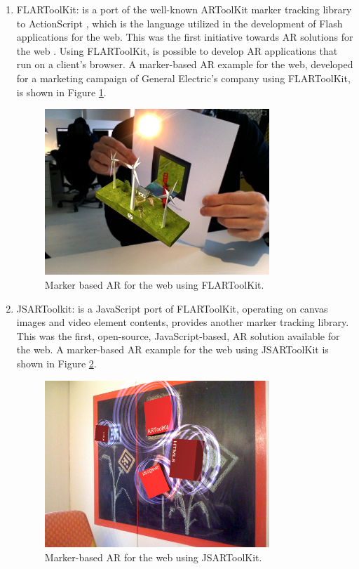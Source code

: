 \begin{enumerate}
    \item FLARToolKit: is a port of the well-known ARToolKit marker tracking library to ActionScript \cite{Flash2013}, which is the language utilized in the development of Flash applications for the web. This was the first initiative towards AR solutions for the web \cite{Pablo2013}. Using FLARToolKit, is possible to develop AR applications that run on a client's browser. A marker-based AR example for the web, developed for a marketing campaign of General Electric's company using FLARToolKit, is shown in Figure \ref{figure:flartoolkit}.

    \begin{figure}[!htb]
      \centering
      \includegraphics[width=240pt]{chapters/tracking_library_for_the_web/flartoolkit.png}
      \caption{Marker based AR for the web using FLARToolKit.}
      \label{figure:flartoolkit}
    \end{figure}

    \item JSARToolkit: is a JavaScript port of FLARToolKit, operating on canvas images and video element contents, provides another marker tracking library. This was the first, open-source, JavaScript-based, AR solution available for the web. A marker-based AR example for the web using JSARToolKit is shown in Figure \ref{figure:jsartoolkit}.

    \begin{figure}[!htb]
      \centering
      \includegraphics[width=240pt]{chapters/tracking_library_for_the_web/jsartoolkit.png}
      \caption{Marker-based AR for the web using JSARToolKit.}
      \label{figure:jsartoolkit}
    \end{figure}


\end{enumerate}
